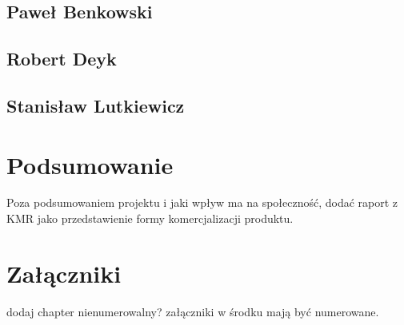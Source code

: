 \documentclass[a4paper,11pt]{report}
\begin{document}
\section {Paweł Benkowski}
\section {Robert Deyk}
\section {Stanisław Lutkiewicz}

\chapter {Podsumowanie}
Poza podsumowaniem projektu i jaki wpływ ma na społeczność, dodać raport z KMR jako przedstawienie formy komercjalizacji produktu.

 


\chapter {Załączniki}
dodaj chapter nienumerowalny? załączniki w środku mają być numerowane.
\end{document}
